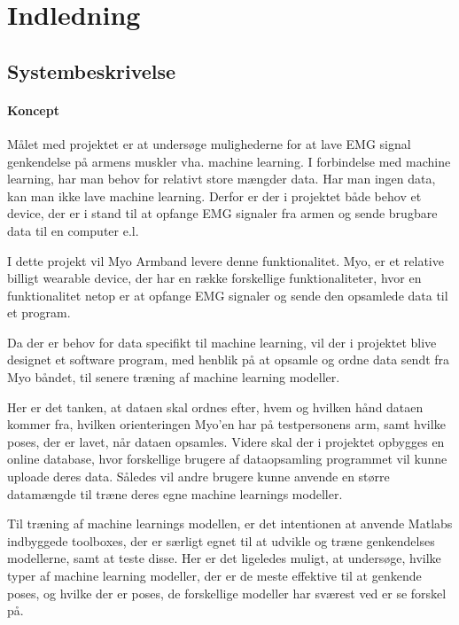 \thispagestyle{fancy}
\chapter{Indledning}
\label{chp:indledning}

\section{Systembeskrivelse}

\subsubsection{Koncept}
Målet med projektet er at undersøge mulighederne for at lave EMG signal genkendelse på armens muskler vha. machine learning.
I forbindelse med machine learning, har man behov for relativt store mængder data. Har man ingen data, kan man ikke lave machine learning. Derfor er der i projektet både behov et device, der er i stand til at opfange EMG signaler fra armen og sende brugbare data til en computer e.l.
 
I dette projekt vil Myo Armband levere denne funktionalitet. Myo, er et relative billigt wearable device, der har en række forskellige funktionaliteter, hvor en funktionalitet netop er at opfange EMG signaler og sende den opsamlede data til et program.

Da der er behov for data specifikt til machine learning, vil der i projektet blive designet et software program, med henblik på at opsamle og ordne data sendt fra Myo båndet, til senere træning af machine learning modeller.

Her er det tanken, at dataen skal ordnes efter, hvem og hvilken hånd dataen kommer fra, hvilken orienteringen Myo’en har på testpersonens arm, samt hvilke poses, der er lavet, når dataen opsamles. Videre skal der i projektet opbygges en online database, hvor forskellige brugere af dataopsamling programmet vil kunne uploade deres data. Således vil andre brugere kunne anvende en større datamængde til træne deres egne machine learnings modeller.

Til træning af machine learnings modellen, er det intentionen at anvende Matlabs indbyggede toolboxes, der er særligt egnet til at udvikle og træne genkendelses modellerne, samt at teste disse. 
Her er det ligeledes muligt, at undersøge, hvilke typer af machine learning modeller, der er de meste effektive til at genkende poses, og hvilke der er poses, de forskellige modeller har sværest ved er se forskel på. 

